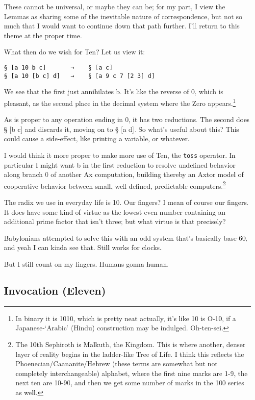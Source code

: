 \documentclass[twoside]{article}
\begin{document}
These cannot be universal, or maybe they can be; for my part, I view the Lemmas as sharing some of the inevitable nature of correspondence, but not so much that I would want to continue down that path further. I'll return to this theme at the proper time.

What then do we wish for Ten? Let us view it:

\begin{lstlisting}[style=listingblock]
§ [a 10 b c]       →    § [a c]
§ [a 10 [b c] d]   →    § [a 9 c 7 [2 3] d]
\end{lstlisting}

We see that the first just annihilates b. It's like the reverse of 0, which is pleasant, as the second place in the decimal system where the Zero appears.\footnote{In binary it is 1010, which is pretty neat actually, it's like 10 is O-10, if a Japanese-`Arabic' (Hindu) construction may be indulged. Oh-ten-sei.}

As is proper to any operation ending in 0, it has two reductions. The second does § [b c] and discards it, moving on to  § [a d]. So what's useful about this? This could cause a side-effect, like printing a variable, or whatever.

I would think it more proper to make more use of Ten, the \texttt{toss} operator. In particular I might want b in the first reduction to resolve undefined behavior along branch 0 of another Ax computation, building thereby an Axtor model of cooperative behavior between small, well-defined, predictable computers.\footnote{The 10th Sephiroth is Malkuth, the Kingdom. This is where another, denser layer of reality begins in the ladder-like Tree of Life. I think this reflects the Phoenecian/Caananite/Hebrew (these terms are somewhat but not completely interchangeable) alphabet, where the first nine marks are 1-9, the next ten are 10-90, and then we get some number of marks in the 100 series as well.}

The radix we use in everyday life is 10. Our fingers? I mean of course our fingers. It does have some kind of virtue as the lowest even number containing an additional prime factor that isn't three; but what virtue is that precisely?

Babylonians attempted to solve this with an odd system that's basically base-60, and yeah I can kinda see that. Still works for clocks.

But I still count on my fingers. Humans gonna human.

\subsection{Invocation (Eleven)}
\end{document}

